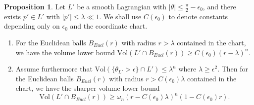 \documentclass[a4paper]{article}
\theoremstyle{definition}
\newtheorem{prop}[thm]{Proposition}
\begin{document}
\begin{prop}\label{monotonicity}
	Let $L'$ be a smooth Lagrangian with $|\theta|\leq \frac{\pi}{2}-\epsilon_0$, and 
	there exists $p'\in L'$ with $|p'|\leq \lambda\ll 1$. We shall use $C(\epsilon_0)$ to denote constants depending only on $\epsilon_0$ and the coordinate chart.
\begin{enumerate}
	\item 
For the Euclidean balls $B_{Eucl}(r)$  with radius $r>\lambda$ contained in the chart, we have the volume lower bound $\text{Vol}(L'\cap B_{Eucl}(r))\geq C(\epsilon_0)(r-\lambda)^n$.
	
	\item Assume furthermore that $\text{Vol}( \{ \theta_{L'}> \epsilon   \}\cap L' ) \leq \lambda^n $ where $\lambda\geq \epsilon^2$. Then for  the Euclidean balls $B_{Eucl}(r)$  with radius $r>C(\epsilon_0)\lambda$ contained in the chart, we have the sharper volume lower bound
\begin{equation}
\text{Vol}(L'\cap B_{Eucl}(r)) \geq \omega_n (r-C(\epsilon_0)\lambda)^n (1-C(\epsilon_0)r).
\end{equation}
\end{enumerate}


\end{prop}
\end{document}
